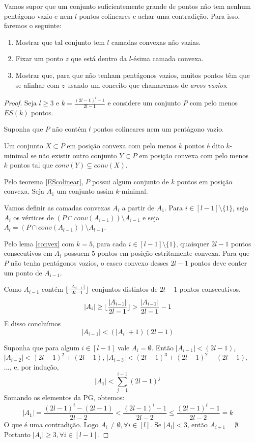 Vamos supor que um conjunto suficientemente grande de pontos não tem nenhum pentágono vazio e nem $l$ pontos colineares e achar uma contradição. Para isso, faremos o seguinte:
\begin{enumerate}
    \item Mostrar que tal conjunto tem $l$ camadas convexas não vazias.
    \item Fixar um ponto $z$ que está dentro da $l$-ésima camada convexa.
    \item Mostrar que, para que não tenham pentágonos vazios, muitos pontos têm que se alinhar com $z$ usando um conceito que chamaremos de \textit{arcos vazios}.
\end{enumerate}

\begin{proof}
    Seja $l\geq 3$ e $k=\frac{(2l-1)^l-1}{2l-1}$ e considere um conjunto $P$ com pelo menos $ES(k)$ pontos.

    Suponha que $P$ não contém $l$ pontos colineares nem um pentágono vazio.

    Um conjunto $X\subset P$ em posição convexa com pelo menos $k$ pontos é dito $k$-minimal se não existir outro conjunto $Y\subset P$ em posição convexa com pelo menos $k$ pontos tal que $conv(Y)\subsetneq conv(X)$.

    Pelo teorema \ref{EScolinear}, $P$ possui algum conjunto de $k$ pontos em posição convexa. Seja $A_1$ um conjunto assim $k$-minimal.

    Vamos definir as camadas convexas $A_i$ a partir de $A_1$.
    Para $i\in[l-1]\setminus\{1\}$, seja $A_i$ os vértices de $(P\cap conv(A_{i-1})) \setminus A_{i-1}$ e seja $A_l=(P\cap conv(A_{l-1}))\setminus A_{l-1}$.

    Pelo lema \ref{convex} com $k=5$, para cada $i\in[l-1]\setminus\{1\}$, quaisquer $2l-1$ pontos consecutivos em $A_i$ possuem $5$ pontos em posição estritamente convexa. Para que $P$ não tenha pentágonos vazios, o casco convexo desses $2l-1$ pontos deve conter um ponto de $A_{i-1}$.

    Como $A_{i-1}$ contém $\lfloor\frac{|A_{i-1}|}{2l-1}\rfloor$ conjuntos distintos de $2l-1$ pontos consecutivos,
    $$|A_i|\geq\lfloor\frac{|A_{i-1}|}{2l-1}\rfloor>\frac{|A_{i-1}|}{2l-1}-1$$
    E disso concluímos
    $$|A_{i-1}|<(|A_i|+1)(2l-1)$$

    Suponha que para algum $i\in[l-1]$ vale $A_i=\emptyset$. Então $|A_{i-1}| < (2l-1)$, $|A_{i-2}| < (2l-1)^2 + (2l-1)$, $|A_{i-3}| < (2l-1)^3 + (2l-1)^2 + (2l-1)$, ..., e, por indução, 
    $$|A_1|<\sum_{j=1}^{i-1}(2l-1)^j$$
    Somando os elementos da PG, obtemos:
    $$|A_1|=\frac{(2l-1)^i-(2l-1)}{2l-2}<\frac{(2l-1)^i-1}{2l-2}\leq\frac{(2l-1)^l-1}{2l-2}=k$$
    O que é uma contradição. Logo $A_i\neq\emptyset, \forall i \in [l]$. Se $|A_i| < 3$, então $A_{i+1}=\emptyset$. Portanto $|A_i|\geq 3,\forall i \in [l-1]$.


\end{proof}
